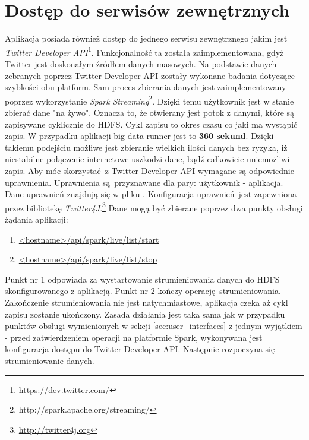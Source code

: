 \section{Dostęp do serwisów zewnętrznych}\label{sec:twitter-api}
Aplikacja posiada również dostęp do jednego serwisu zewnętrznego jakim jest \textit{Twitter Developer API}\footnote{\url{https://dev.twitter.com/}}. Funkcjonalność ta została zaimplementowana, gdyż Twitter jest doskonałym źródłem danych masowych. Na podstawie danych zebranych poprzez Twitter Developer API zostały wykonane badania dotyczące szybkości obu platform. Sam proces zbierania danych jest zaimplementowany poprzez wykorzystanie \textit{Spark Streaming}\footnote{http://spark.apache.org/streaming/}. Dzięki temu użytkownik jest w stanie zbierać dane "na żywo". Oznacza to, że otwierany jest potok z danymi, które są zapisywane cyklicznie do HDFS. Cykl zapisu to okres czasu co jaki ma wystąpić zapis. W przypadku aplikacji big-data-runner jest to \textbf{360 sekund}. Dzięki takiemu podejściu możliwe jest zbieranie wielkich ilości danych bez ryzyka, iż niestabilne połączenie internetowe uszkodzi dane, bądź całkowicie uniemożliwi zapis. Aby móc skorzystać z Twitter Developer API wymagane są odpowiednie uprawnienia. Uprawnienia są przyznawane dla pary: użytkownik - aplikacja. Dane uprawnień znajdują się w pliku . Konfiguracja uprawnień jest zapewniona przez bibliotekę \textit{Twitter4J}.\footnote{\url{http://twitter4j.org}}
\newline Dane mogą być zbierane poprzez dwa punkty obsługi żądania aplikacji:
\begin{enumerate}
	\item{\url{<hostname>/api/spark/live/list/start}}
	\item{\url{<hostname>/api/spark/live/list/stop}}
\end{enumerate}
Punkt nr 1 odpowiada za wystartowanie strumieniowania danych do HDFS skonfigurowanego z aplikacją. Punkt nr 2 kończy operację strumieniowania. Zakończenie strumieniowania nie jest natychmiastowe, aplikacja czeka aż cykl zapisu zostanie ukończony. Zasada działania jest taka sama jak w przypadku punktów obsługi wymienionych w sekcji \ref{sec:user_interfaces} z jednym wyjątkiem - przed zatwierdzeniem operacji na platformie Spark, wykonywana jest konfiguracja dostępu do Twitter Developer API. Następnie rozpoczyna się strumieniowanie danych.
